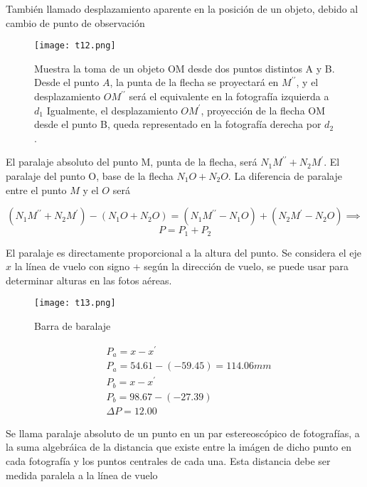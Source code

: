 \begin{definition}[Paralaje]
  También llamado desplazamiento aparente en la posición de un objeto, debido al cambio de punto de observación
\end{definition}

\begin{figure}[h!]
  \centerline{\texttt{[image: t12.png]}}
  \caption{Muestra la toma de un objeto OM desde dos puntos distintos A y B. Desde el punto $A$, la punta de la flecha se proyectará en $M^{\prime\prime}$, y el desplazamiento $OM^{\prime\prime}$ será el equivalente en la fotografía izquierda a $d_1$ Igualmente, el desplazamiento $OM^{\prime}$, proyección de la flecha OM desde el punto B, queda representado en la fotografía derecha por $d_2$.}
  \label{t12}
\end{figure}

El paralaje absoluto del punto M, punta de la flecha, será $N_1M^{\prime\prime}+N_2M^{\prime}$. El paralaje del punto O, base de la flecha $N_1O+N_2O$. La diferencia de paralaje entre el punto $M$ y el $O$ será 

\begin{equation*}
  \left(N_1M^{\prime\prime}+N_2M^{\prime}\right)-\left(N_1O+N_2O\right)=\left(N_1M^{\prime\prime}-N_1O\right)+\left(N_2M^{\prime}-N_2O\right)\implies
\end{equation*}
\begin{equation}
  P=P_1+P_2
\end{equation}

El paralaje es directamente proporcional a la altura del punto. Se considera el eje $x$ la línea de vuelo con signo + según la dirección de vuelo, se puede usar para determinar alturas en las fotos aéreas.

\begin{figure}[h!]
  \centerline{\texttt{[image: t13.png]}}
  \caption{Barra de baralaje}
  \label{t13}
\end{figure}
\begin{align*}
  &P_a=x-x^{\prime}\\
  &P_a=54.61-(-59.45)=114.06mm\\
  &P_b=x-x^{\prime}\\
  &P_b=98.67-(-27.39)\\
  &\Delta P=12.00
\end{align*}

Se llama paralaje absoluto de un punto en un par estereoscópico de fotografías, a la suma algebráica de la distancia que existe entre la imágen de dicho punto en cada fotografía y los puntos centrales de cada una. Esta distancia debe ser medida paralela a la línea de vuelo

